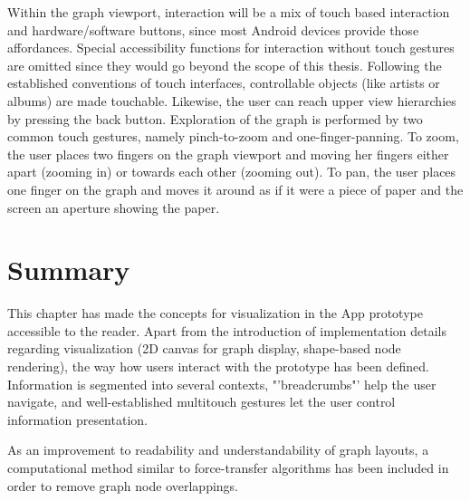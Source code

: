 Within the graph viewport, interaction will be a mix of touch based interaction and hardware/software buttons, since most Android devices provide those affordances. Special accessibility functions for interaction without touch gestures are omitted since they would go beyond the scope of this thesis.
Following the established conventions of touch interfaces, controllable objects (like artists or albums) are made touchable. Likewise, the user can reach upper view hierarchies by pressing the back button.
Exploration of the graph is performed by two common touch gestures, namely pinch-to-zoom and one-finger-panning. To zoom, the user places two fingers on the graph viewport and moving her fingers either apart (zooming in) or towards each other (zooming out). To pan, the user places one finger on the graph and moves it around as if it were a piece of paper and the screen an aperture showing the paper.

\section{Summary}

This chapter has made the concepts for visualization in the App prototype accessible to the reader. Apart from the introduction of implementation details regarding visualization (2D canvas for graph display, shape-based node rendering), the way how users interact with the prototype has been defined. Information is segmented into several contexts, "'breadcrumbs"' help the user navigate, and well-established multitouch gestures let the user control information presentation. 

As an improvement to readability and understandability of graph layouts, a computational method similar to force-transfer algorithms has been included in order to remove graph node overlappings.